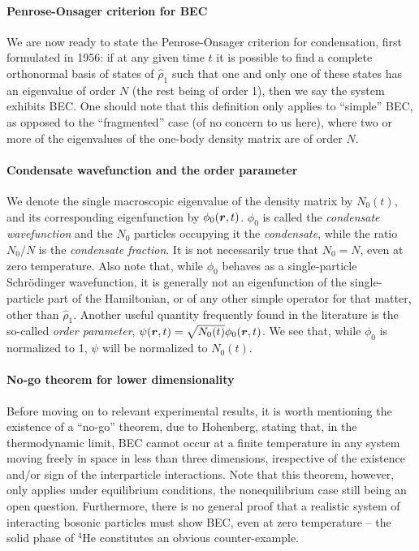 \paragraph{Penrose-Onsager criterion for BEC}
We are now ready to state the Penrose-Onsager criterion for
condensation, first formulated in 1956: if at any given time $t$ it is
possible to find a complete orthonormal basis of states of
$\hat{\rho}_1$ such that one and only one of these states has an
eigenvalue of order $N$ (the rest being of order 1), then we say the
system exhibits BEC. One should note that this definition only applies
to ``simple'' BEC, as opposed to the ``fragmented'' case (of no
concern to us here), where two or more of the eigenvalues of the
one-body density matrix are of order $N$.

\paragraph{Condensate wavefunction and the order parameter}
We denote the single macroscopic eigenvalue of the density matrix by
$N_0(t)$, and its corresponding eigenfunction by
$\phi_0(\bm{r},t)$. $\phi_0$ is called the \textit{condensate
  wavefunction} and the $N_0$ particles occupying it the
\textit{condensate}, while the ratio $N_0/N$ is the \textit{condensate
  fraction}. It is not necessarily true that $N_0 = N$, even at zero
temperature. Also note that, while $\phi_0$ behaves as a
single-particle Schr\"{o}dinger wavefunction, it is generally not an
eigenfunction of the single-particle part of the Hamiltonian, or of
any other simple operator for that matter, other than
$\hat{\rho}_1$. Another useful quantity frequently found in the
literature is the so-called \textit{order parameter},
$\psi(\bm{r},t) = \sqrt{N_0(t)}\phi_0(\bm{r},t)$. We see that, while
$\phi_0$ is normalized to 1, $\psi$ will be normalized to $N_0(t)$.

\paragraph{No-go theorem for lower dimensionality}
Before moving on to relevant experimental results, it is worth
mentioning the existence of a ``no-go'' theorem, due to Hohenberg,
stating that, in the thermodynamic limit, BEC cannot occur at a finite
temperature in any system moving freely in space in less than three
dimensions, irespective of the existence and/or sign of the
interparticle interactions. Note that this theorem, however, only
applies under equilibrium conditions, the nonequilibrium case still
being an open question.  Furthermore, there is no general proof that a
realistic system of interacting bosonic particles must show BEC, even
at zero temperature -- the solid phase of ${}^4$He constitutes an
obvious counter-example.

